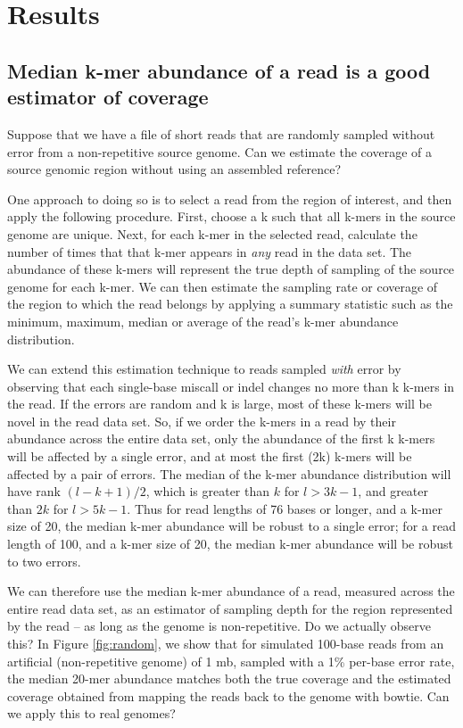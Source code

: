 \documentclass[10pt,draft]{article}
\begin{document}
\section*{Results}

\subsection*{Median k-mer abundance of a read is a good estimator of coverage}

Suppose that we have a file of short reads that are randomly sampled
without error from a non-repetitive source genome.  Can we estimate
the coverage of a source genomic region without using an assembled
reference?

One approach to doing so is to select a read from the region of
interest, and then apply the following procedure. First, choose a k
such that all k-mers in the source genome are unique.  Next, for each
k-mer in the selected read, calculate the number of times that that
k-mer appears in {\em any} read in the data set.  The abundance of
these k-mers will represent the true depth of sampling of the source
genome for each k-mer.  We can then estimate the sampling rate or
coverage of the region to which the read belongs by applying a summary
statistic such as the minimum, maximum, median or average of the
read's k-mer abundance distribution.

We can extend this estimation technique to reads sampled {\em with}
error by observing that each single-base miscall or indel changes no
more than k k-mers in the read.  If the errors are random and k is
large, most of these k-mers will be novel in the read data set.  So,
if we order the k-mers in a read by their abundance across the entire
data set, only the abundance of the first k k-mers will be affected by
a single error, and at most the first (2k) k-mers will be affected by
a pair of errors.  The median of the k-mer abundance distribution will
have rank $(l - k + 1) / 2$, which is greater than $k$ for $l > 3k-1$,
and greater than $2k$ for $l > 5k-1$.  Thus for read lengths of 76
bases or longer, and a k-mer size of 20, the median k-mer abundance
will be robust to a single error; for a read length of 100, and a
k-mer size of 20, the median k-mer abundance will be robust to two
errors.

We can therefore use the median k-mer abundance of a read, measured
across the entire read data set, as an estimator of sampling depth for
the region represented by the read -- as long as the genome is
non-repetitive.  Do we actually observe this?  In Figure \ref{fig:random},
we show
that for simulated 100-base reads from an artificial (non-repetitive
genome) of 1 mb, sampled with a 1\% per-base error rate, the median
20-mer abundance matches both the true coverage and the estimated
coverage obtained from mapping the reads back to the genome with
bowtie.  Can we apply this to real genomes?
\end{document}
